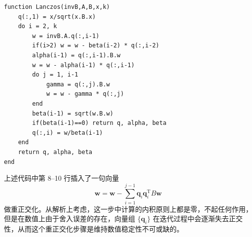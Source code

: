 \begin{algorithmBox}
\begin{lstlisting}[style=bellacode]
function Lanczos(invB,A,B,x,k)
    q(:,1) = x/sqrt(x.B.x)
    do i = 2, k
        w = invB.A.q(:,i-1)
        if(i>2) w = w - beta(i-2) * q(:,i-2)
        alpha(i-1) = q(:,i-1).B.w
        w = w - alpha(i-1) * q(:,i-1)
        do j = 1, i-1
            gamma = q(:,j).B.w
            w = w - gamma * q(:,j)
        end
        beta(i-1) = sqrt(w.B.w)
        if(beta(i-1)==0) return q, alpha, beta
        q(:,i) = w/beta(i-1)
    end
    return q, alpha, beta
end
\end{lstlisting}
\end{algorithmBox}
上述代码中第 8--10 行插入了一句向量
\[
\bm w=\bm w-\sum_{i=1}^{j-1}\bm q_i\bm q_i^{\mathrm T}B\bm w
\]
做重正交化。从解析上考虑，这一步中计算的内积原则上都是零，不起任何作用，但是在数值上由于舍入误差的存在，向量组 $\{\bm q_i\}$ 在迭代过程中会逐渐失去正交性，从而这个重正交化步骤是维持数值稳定性不可或缺的。

